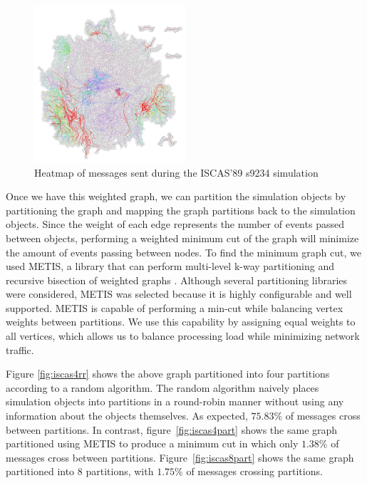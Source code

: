 \documentclass{wscpaperproc}
\begin{document}
\begin{figure}[h]
\centering
\includegraphics[clip=true,width=0.5\textwidth]{s9234_1part}
\caption{Heatmap of messages sent during the ISCAS'89 s9234 simulation}
\label{fig:iscasUnpart}
\end{figure}

Once we have this weighted graph, we can partition the simulation objects by partitioning the graph and mapping the graph partitions back to the simulation objects. Since the weight of each edge represents the number of events passed between objects, performing a weighted minimum cut of the graph will minimize the amount of events passing between nodes. To find the minimum graph cut, we used METIS, a library that can perform multi-level k-way partitioning and recursive bisection of weighted graphs \cite{karypis-98}. Although several partitioning libraries were considered, METIS was selected because it is highly configurable and well supported. METIS is capable of performing a min-cut while balancing vertex weights between partitions. We use this capability by assigning equal weights to all vertices, which allows us to balance processing load while minimizing network traffic.

 Figure \ref{fig:iscas4rr} shows the above graph partitioned into four partitions according to a random algorithm. The random algorithm naively places simulation objects into partitions in a round-robin manner without using any information about the objects themselves. As expected, \(75.83\%\) of messages cross between partitions. In contrast, figure~\ref{fig:iscas4part} shows the same graph partitioned using METIS to produce a minimum cut in which only \(1.38\%\) of messages cross between partitions. Figure~\ref{fig:iscas8part} shows the same graph partitioned into 8 partitions, with \(1.75\%\) of messages crossing partitions.
\end{document}
